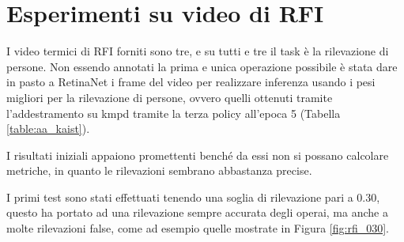 \section{Esperimenti su video di RFI}
\label{sec:RFI_video_experiment}

I video termici di \ac{RFI} forniti sono tre, e su tutti e tre il task è la rilevazione di persone. Non essendo annotati la prima e unica operazione possibile è stata dare in pasto a RetinaNet i frame del video per realizzare inferenza usando i pesi migliori per la rilevazione di persone, ovvero quelli ottenuti tramite l'addestramento su \ac{kmpd} tramite la terza policy all'epoca 5 (Tabella \ref{table:aa_kaist}). 

I risultati iniziali appaiono promettenti benché da essi non si possano calcolare metriche, in quanto le rilevazioni sembrano abbastanza precise. 

I primi test sono stati effettuati tenendo una soglia di rilevazione pari a $0.30$, questo ha portato ad una rilevazione sempre accurata degli operai, ma anche a molte rilevazioni false, come ad esempio quelle mostrate in Figura \ref{fig:rfi_030}. 

